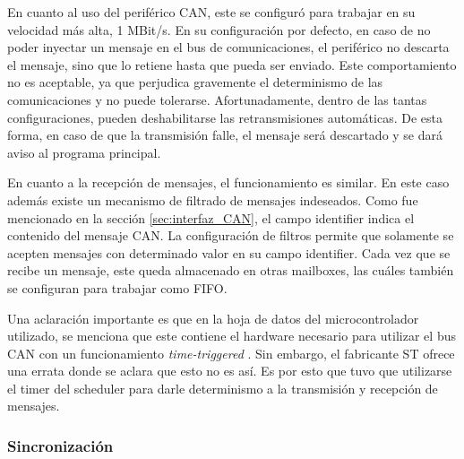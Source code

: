 En cuanto al uso del periférico CAN, este se configuró para trabajar en su velocidad más alta, 1 MBit/s. %
En su configuración por defecto, en caso de no poder inyectar un mensaje en el bus de comunicaciones, el periférico no descarta el mensaje, sino que lo retiene hasta que pueda ser enviado. Este comportamiento no es aceptable, ya que perjudica gravemente el determinismo de las comunicaciones y no puede tolerarse. Afortunadamente, dentro de las tantas configuraciones, pueden deshabilitarse las retransmisiones automáticas. De esta forma, en caso de que la transmisión falle, el mensaje será descartado y se dará aviso al programa principal.

En cuanto a la recepción de mensajes, el funcionamiento es similar. En este caso además existe un mecanismo de filtrado de mensajes indeseados. Como fue mencionado en la sección \ref{sec:interfaz_CAN}, el campo identifier indica el contenido del mensaje CAN. La configuración de filtros permite que solamente se acepten mensajes con determinado valor en su campo identifier. Cada vez que se recibe un mensaje, este queda almacenado en otras mailboxes, las cuáles también se configuran para trabajar como FIFO.


Una aclaración importante es que en la hoja de datos del microcontrolador utilizado, se menciona que este contiene el hardware necesario para utilizar el bus CAN con un funcionamiento \textit{time-triggered} \cite[p.~1295]{RM0385}. Sin embargo, el fabricante ST ofrece una errata \cite{STM32F746_errata} donde se aclara que esto no es así. Es por esto que tuvo que utilizarse el timer del scheduler para darle determinismo a la transmisión y recepción de mensajes.

\subsubsection{Sincronización}

